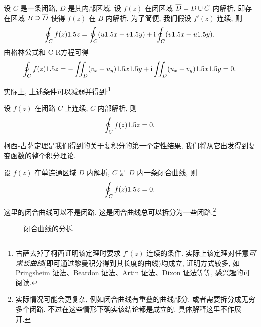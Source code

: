 设 $C$ 是一条闭路, $D$ 是其内部区域.
设 $f(z)$ 在闭区域 $\overline D=D\cup C$ 内解析, 即存在区域 $B\supseteq\overline D$ 使得 $f(z)$ 在 $B$ 内解析.
为了简便, 我们假设 $f'(z)$ 连续,
则
\[
   \oint_C f(z)1.5 z
  =\oint_C (u1.5 x-v1.5 y)+\mathrm{i}\oint_C (v1.5 x+u1.5 y).
\]
由格林公式和 C-R方程可得
\[
   \oint_C f(z)1.5 z
  =-\iint_D(v_x+u_y)1.5 x1.5 y+\mathrm{i}\iint_D(u_x-v_y)1.5 x1.5 y
  =0.
\]

实际上, 上述条件可以减弱并得到:\footnote{
  古萨去掉了柯西证明该定理时要求 $f'(z)$ 连续的条件.
  实际上该定理对任意\emph{可求长曲线}(即可通过黎曼积分得到其长度的曲线)均成立, 证明方式较多, 如 Pringsheim 证法、Beardon 证法、Artin 证法、Dixon 证法等等, 感兴趣的可阅读\cite{Ahlfors2022,FanHe1987,ShiLiu1998,ZhuangZhang1984}.
}
\begin{theorem}[柯西-古萨定理]
  \label{thm:Cauchy-Goursat}
  设 $f(z)$ 在闭路 $C$ 上连续, $C$ 内部解析, 则
  \[
    \oint_C f(z)1.5 z=0.
  \]
\end{theorem}

柯西-古萨定理是我们得到的关于复积分的第一个定性结果, 我们将从它出发得到复变函数的整个积分理论.

\begin{corollary}
  设 $f(z)$ 在单连通区域 $D$ 内解析, $C$ 是 $D$ 内一条闭合曲线, 则
  \[
    \oint_C f(z)1.5 z=0.
  \]
\end{corollary}

这里的闭合曲线可以不是闭路, 这是闭合曲线总可以拆分为一些闭路.\footnote{
  实际情况可能会更复杂, 例如闭合曲线有重叠的曲线部分, 或者需要拆分成无穷多个闭路.
  不过在这些情形下确实该结论都是成立的, 具体解释这里不作展开.
}

\begin{figure}[H]
  \centering
  \caption{闭合曲线的分拆}
\end{figure}



